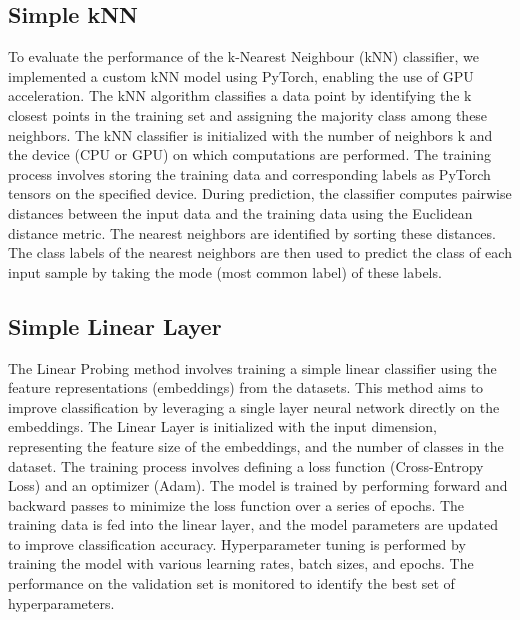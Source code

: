 \documentclass[a4paper]{article}
\begin{document}
\subsection{Simple kNN}
To evaluate the performance of the k-Nearest Neighbour (kNN) classifier, we implemented a custom kNN model using PyTorch, enabling the use of GPU acceleration. The kNN algorithm classifies a data point by identifying the k closest points in the training set and assigning the majority class among these neighbors. The kNN classifier is initialized with the number of neighbors k and the device (CPU or GPU) on which computations are performed. The training process involves storing the training data and corresponding labels as PyTorch tensors on the specified device. During prediction, the classifier computes pairwise distances between the input data and the training data using the Euclidean distance metric. The nearest neighbors are identified by sorting these distances. The class labels of the nearest neighbors are then used to predict the class of each input sample by taking the mode (most common label) of these labels.

\subsection{Simple Linear Layer}
The Linear Probing method involves training a simple linear classifier using the feature representations (embeddings) from the datasets. This method aims to improve classification by leveraging a single layer neural network directly on the embeddings. The Linear Layer is initialized with the input dimension, representing the feature size of the embeddings, and the number of classes in the dataset. The training process involves defining a loss function (Cross-Entropy Loss) and an optimizer (Adam). The model is trained by performing forward and backward passes to minimize the loss function over a series of epochs. The training data is fed into the linear layer, and the model parameters are updated to improve classification accuracy. Hyperparameter tuning is performed by training the model with various learning rates, batch sizes, and epochs. The performance on the validation set is monitored to identify the best set of hyperparameters.
\end{document}
